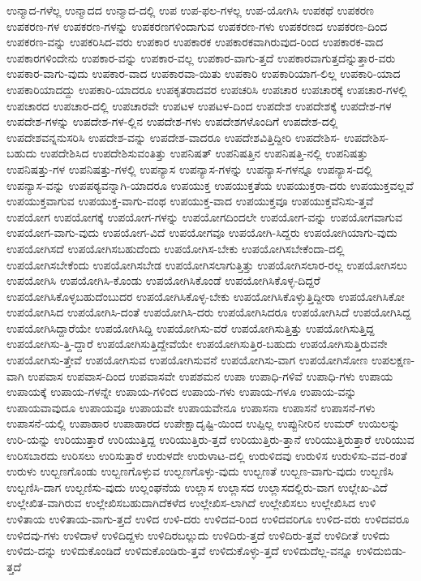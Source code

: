 {ಉನ್ಮಾದ-ಗಳೆಲ್ಲ
ಉನ್ಮಾದದ
ಉನ್ಮಾದ-ದಲ್ಲಿ
ಉಪ
ಉಪ-ಫಲ-ಗಳಲ್ಲ
ಉಪ-ಯೋಗಿಸಿ
ಉಪಕಥೆ
ಉಪಕರಣ
ಉಪಕರಣ-ಗಳ
ಉಪಕರಣ-ಗಳನ್ನು
ಉಪಕರಣಗಳಿಂದಾಗುವ
ಉಪಕರಣ-ಗಳು
ಉಪಕರಣದ
ಉಪಕರಣ-ದಿಂದ
ಉಪಕರಣ-ವನ್ನು
ಉಪಕರಿಸಿದ-ವರು
ಉಪಕಾರ
ಉಪಕಾರಕ
ಉಪಕಾರಕವಾಗಿರುವುದ-ರಿಂದ
ಉಪಕಾರಕ-ವಾದ
ಉಪಕಾರಗಳಿಂದೇನು
ಉಪಕಾರ-ವನ್ನು
ಉಪಕಾರ-ವಲ್ಲ
ಉಪಕಾರ-ವಾಗು-ತ್ತದೆ
ಉಪಕಾರವಾಗುತ್ತದೆನ್ನುತ್ತಾರ-ವರು
ಉಪಕಾರ-ವಾಗು-ವುದು
ಉಪಕಾರ-ವಾದ
ಉಪಕಾರವಾ-ಯಿತು
ಉಪಕಾರಿ
ಉಪಕಾರಿಯಾಗ-ಲಿಲ್ಲ
ಉಪಕಾರಿ-ಯಾದ
ಉಪಕಾರಿಯಾದದ್ದು
ಉಪಕಾರಿ-ಯಾದರೂ
ಉಪಕೃತರಾದವರ
ಉಪಚರಿಸಿ
ಉಪಚಾರ
ಉಪಚಾರಕ್ಕೆ
ಉಪಚಾರ-ಗಳಲ್ಲಿ
ಉಪಚಾರದ
ಉಪಚಾರ-ದಲ್ಲಿ
ಉಪಚಾರವೇ
ಉಪಟಳ
ಉಪಟಳ-ದಿಂದ
ಉಪದೇಶ
ಉಪದೇಶಕ್ಕೆ
ಉಪದೇಶ-ಗಳ
ಉಪದೇಶ-ಗಳನ್ನು
ಉಪದೇಶ-ಗಳ-ಲ್ಲಿನ
ಉಪದೇಶ-ಗಳು
ಉಪದೇಶಗಳೊಂದಿಗೆ
ಉಪದೇಶ-ದಲ್ಲಿ
ಉಪದೇಶವನ್ನನುಸರಿಸಿ
ಉಪದೇಶ-ವನ್ನು
ಉಪದೇಶ-ವಾದರೂ
ಉಪದೇಶವಿತ್ತಿದ್ದೀರಿ
ಉಪದೇಶಿಸ-
ಉಪದೇಶಿಸ-ಬಹುದು
ಉಪದೇಶಿಸಿದ
ಉಪದೇಶಿಸುವಂತಿತ್ತು
ಉಪನಿಷತ್
ಉಪನಿಷತ್ತಿನ
ಉಪನಿಷತ್ತಿ-ನಲ್ಲಿ
ಉಪನಿಷತ್ತು
ಉಪನಿಷತ್ತು-ಗಳ
ಉಪನಿಷತ್ತು-ಗಳಲ್ಲಿ
ಉಪನ್ಯಾಸ
ಉಪನ್ಯಾಸ-ಗಳನ್ನು
ಉಪನ್ಯಾಸ-ಗಳನ್ನೂ
ಉಪನ್ಯಾಸ-ದಲ್ಲಿ
ಉಪನ್ಯಾಸ-ವನ್ನು
ಉಪಪಠ್ಯವನ್ನಾಗಿ-ಯಾದರೂ
ಉಪಯುಕ್ತ
ಉಪಯುಕ್ತತೆಯ
ಉಪಯುಕ್ತರಾ-ದರು
ಉಪಯುಕ್ತವಲ್ಲವೆ
ಉಪಯುಕ್ತವಾಗುವ
ಉಪಯುಕ್ತ-ವಾಗು-ವಂಥ
ಉಪಯುಕ್ತ-ವಾದ
ಉಪಯುಕ್ತವೂ
ಉಪಯುಕ್ತವೆನಿಸು-ತ್ತವೆ
ಉಪಯೋಗ
ಉಪಯೋಗಕ್ಕೆ
ಉಪಯೋಗ-ಗಳನ್ನು
ಉಪಯೋಗದಿಂದಲೇ
ಉಪಯೋಗ-ವನ್ನು
ಉಪಯೋಗವಾಗುವ
ಉಪಯೋಗ-ವಾಗು-ವುದು
ಉಪಯೋಗ-ವಿದೆ
ಉಪಯೋಗವೂ
ಉಪಯೋಗಿ-ಸಿದ್ದರು
ಉಪಯೋಗಿಯಾಗು-ವುದು
ಉಪಯೋಗಿಸದೆ
ಉಪಯೋಗಿಸಬಹುದೆಂದು
ಉಪಯೋಗಿಸ-ಬೇಕು
ಉಪಯೋಗಿಸಬೇಕೆಂದಾ-ದಲ್ಲಿ
ಉಪಯೋಗಿಸಬೇಕೆಂದು
ಉಪಯೋಗಿಸಬೇಡ
ಉಪಯೋಗಿಸಲಾಗುತ್ತಿತ್ತು
ಉಪಯೋಗಿಸಲಾರ-ರಲ್ಲ
ಉಪಯೋಗಿಸಲು
ಉಪಯೋಗಿಸಿ
ಉಪಯೋಗಿಸಿ-ಕೊಂಡು
ಉಪಯೋಗಿಸಿಕೊಂಡೆ
ಉಪಯೋಗಿಸಿಕೊಳ್ಳ-ದಿದ್ದರೆ
ಉಪಯೋಗಿಸಿಕೊಳ್ಳಬಹುದೆಂಬುದರ
ಉಪಯೋಗಿಸಿಕೊಳ್ಳ-ಬೇಕು
ಉಪಯೋಗಿಸಿಕೊಳ್ಳುತ್ತಿದ್ದೀರಾ
ಉಪಯೋಗಿಸಿಕೋ
ಉಪಯೋಗಿಸಿದ
ಉಪಯೋಗಿಸಿ-ದಂತೆ
ಉಪಯೋಗಿಸಿ-ದರು
ಉಪಯೋಗಿಸಿದರೂ
ಉಪಯೋಗಿಸಿದೆ
ಉಪಯೋಗಿಸಿದ್ದ
ಉಪಯೋಗಿಸಿದ್ದಾರೆಯೇ
ಉಪಯೋಗಿಸಿದ್ದಿ
ಉಪಯೋಗಿಸು-ವರೆ
ಉಪಯೋಗಿಸುತ್ತಿತ್ತು
ಉಪಯೋಗಿಸುತ್ತಿದ್ದ
ಉಪಯೋಗಿಸು-ತ್ತಿ-ದ್ದಾರೆ
ಉಪಯೋಗಿಸುತ್ತಿದ್ದೇವೆಯೇ
ಉಪಯೋಗಿಸುತ್ತಿರ-ಬಹುದು
ಉಪಯೋಗಿಸುತ್ತಿರುವನೇ
ಉಪಯೋಗಿಸು-ತ್ತೇವೆ
ಉಪಯೋಗಿಸುವ
ಉಪಯೋಗಿಸುವನೆ
ಉಪಯೋಗಿಸು-ವಾಗ
ಉಪಯೋಗಿಸೋಣ
ಉಪಲಕ್ಷಣ-ವಾಗಿ
ಉಪವಾಸ
ಉಪವಾಸ-ದಿಂದ
ಉಪವಾಸವೇ
ಉಪಶಮನ
ಉಪಾ
ಉಪಾಧಿ-ಗಳಿವೆ
ಉಪಾಧಿ-ಗಳು
ಉಪಾಯ
ಉಪಾಯಕ್ಕೆ
ಉಪಾಯ-ಗಳನ್ನೇ
ಉಪಾಯ-ಗಳಿಂದ
ಉಪಾಯ-ಗಳು
ಉಪಾಯ-ಗಳೂ
ಉಪಾಯ-ವನ್ನು
ಉಪಾಯವಾವುದೂ
ಉಪಾಯವೂ
ಉಪಾಯವೇ
ಉಪಾಯವೇನೂ
ಉಪಾಸನಾ
ಉಪಾಸನೆ
ಉಪಾಸನೆ-ಗಳು
ಉಪಾಸನೆ-ಯಲ್ಲಿ
ಉಪಾಹಾರ
ಉಪಾಹಾರದ
ಉಪೇಕ್ಷಾದೃಷ್ಟಿ-ಯಿಂದ
ಉಪ್ಪಿಲ್ಲ
ಉಪ್ಪುನೀರಿನ
ಉಮರ್
ಉಯಿಲನ್ನು
ಉರಿ-ಯನ್ನು
ಉರಿಯುತ್ತಾರೆ
ಉರಿಯುತ್ತಿದ್ದ
ಉರಿಯುತ್ತಿರು-ತ್ತದೆ
ಉರಿಯುತ್ತಿರು-ತ್ತಾನೆ
ಉರಿಯುತ್ತಿರುತ್ತಾರೆ
ಉರಿಯುವ
ಉರಿಸಬಾರದು
ಉರಿಸಲು
ಉರಿಸುತ್ತಾರೆ
ಉರುಳದೇ
ಉರುಳಾಟ-ದಲ್ಲಿ
ಉರುಳಿದವು
ಉರುಳಿಸ
ಉರುಳಿಸು-ವವ-ರಂತೆ
ಉರುಳು
ಉಲ್ಬಣಗೊಂಡು
ಉಲ್ಬಣಗೊಳ್ಳುವ
ಉಲ್ಬಣಗೊಳ್ಳು-ವುದು
ಉಲ್ಬಣತೆ
ಉಲ್ಬಣ-ವಾಗು-ವುದು
ಉಲ್ಬಣಿಸಿ
ಉಲ್ಬಣಿಸಿ-ದಾಗ
ಉಲ್ಬಣಿಸು-ವುದು
ಉಲ್ಲಂಘನೆಯ
ಉಲ್ಲಾಸ
ಉಲ್ಲಾಸದ
ಉಲ್ಲಾಸದಲ್ಲಿರು-ವಾಗ
ಉಲ್ಲೇಖ-ವಿದೆ
ಉಲ್ಲೇಖಿತ-ವಾಗಿರುವ
ಉಲ್ಲೇಖಿಸಬಹುದಾಗಿದೆಕಳೆದ
ಉಲ್ಲೇಖಿಸ-ಲಾಗಿದೆ
ಉಲ್ಲೇಖಿಸಲು
ಉಲ್ಲೇಖಿಸಿದ
ಉಳಿ
ಉಳಿತಾಯ
ಉಳಿತಾಯ-ವಾಗು-ತ್ತದೆ
ಉಳಿದ
ಉಳಿ-ದರು
ಉಳಿದವ-ರಿಂದ
ಉಳಿದವರಿಗೂ
ಉಳಿದ-ವರು
ಉಳಿದವರೂ
ಉಳಿದವು-ಗಳು
ಉಳಿದಾಳೆ
ಉಳಿದಿದ್ದಳು
ಉಳಿದಿರಬಲ್ಲುದು
ಉಳಿದಿರು-ತ್ತದೆ
ಉಳಿದಿರು-ತ್ತವೆ
ಉಳಿದೀತೆ
ಉಳಿದು
ಉಳಿದು-ದನ್ನು
ಉಳಿದುಕೊಂಡಿದೆ
ಉಳಿದುಕೊಂಡಿರು-ತ್ತವೆ
ಉಳಿದುಕೊಳ್ಳು-ತ್ತದೆ
ಉಳಿದುದೆಲ್ಲ-ವನ್ನೂ
ಉಳಿದುಬಿಡು-ತ್ತದೆ
}
